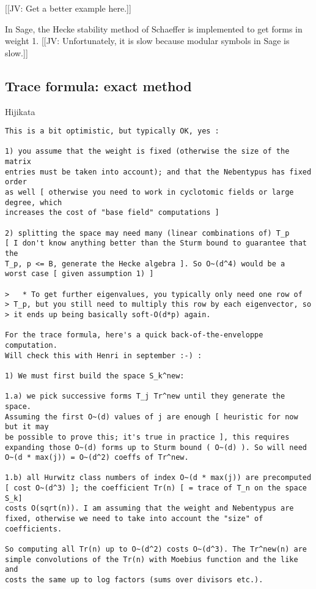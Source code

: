 \documentclass[11pt]{amsart}
\numberwithin{equation}{subsection}
\theoremstyle{plain}
\theoremstyle{definition}
\newcommand{\jv}[1]{{\color{red} \textsf{[[JV: #1]]}}}
\begin{document}
\jv{Get a better example here.}

In Sage, the Hecke stability method of Schaeffer \cite{Schaeffer} is implemented to get forms in weight 1.  \jv{Unfortunately, it is slow because modular symbols in Sage is slow.}

\subsection{Trace formula: exact method}

Hijikata

\begin{verbatim}
This is a bit optimistic, but typically OK, yes :

1) you assume that the weight is fixed (otherwise the size of the matrix
entries must be taken into account); and that the Nebentypus has fixed order
as well [ otherwise you need to work in cyclotomic fields or large degree, which
increases the cost of "base field" computations ]

2) splitting the space may need many (linear combinations of) T_p 
[ I don't know anything better than the Sturm bound to guarantee that the
T_p, p <= B, generate the Hecke algebra ]. So O~(d^4) would be a
worst case [ given assumption 1) ]

>   * To get further eigenvalues, you typically only need one row of
> T_p, but you still need to multiply this row by each eigenvector, so
> it ends up being basically soft-O(d*p) again.

For the trace formula, here's a quick back-of-the-enveloppe computation.
Will check this with Henri in september :-) :

1) We must first build the space S_k^new: 

1.a) we pick successive forms T_j Tr^new until they generate the space.
Assuming the first O~(d) values of j are enough [ heuristic for now but it may
be possible to prove this; it's true in practice ], this requires
expanding those O~(d) forms up to Sturm bound ( O~(d) ). So will need
O~(d * max(j)) = O~(d^2) coeffs of Tr^new.

1.b) all Hurwitz class numbers of index O~(d * max(j)) are precomputed
[ cost O~(d^3) ]; the coefficient Tr(n) [ = trace of T_n on the space S_k]
costs O(sqrt(n)). I am assuming that the weight and Nebentypus are
fixed, otherwise we need to take into account the "size" of coefficients.

So computing all Tr(n) up to O~(d^2) costs O~(d^3). The Tr^new(n) are
simple convolutions of the Tr(n) with Moebius function and the like and
costs the same up to log factors (sums over divisors etc.).


\end{verbatim}
\end{document}
